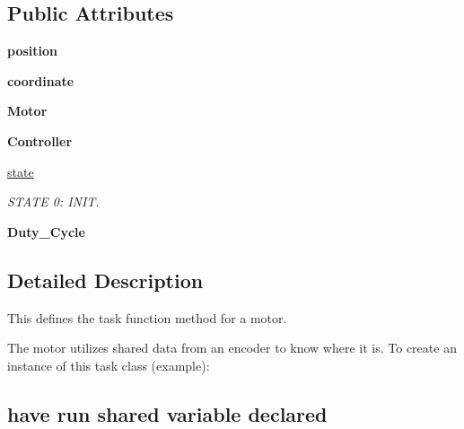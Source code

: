 \subsection*{Public Attributes}
\begin{DoxyCompactItemize}
\item 
{\bfseries position}\hypertarget{classmotor__task__func_1_1Motor__Task_acceb80bb53adab2e82316b4f0b1106d6}{}\label{classmotor__task__func_1_1Motor__Task_acceb80bb53adab2e82316b4f0b1106d6}

\item 
{\bfseries coordinate}\hypertarget{classmotor__task__func_1_1Motor__Task_aa3c4b7c549cf5ce2ea041b097075c2b3}{}\label{classmotor__task__func_1_1Motor__Task_aa3c4b7c549cf5ce2ea041b097075c2b3}

\item 
{\bfseries Motor}\hypertarget{classmotor__task__func_1_1Motor__Task_a625735c62f6b22e02d1d5a31606ed3cf}{}\label{classmotor__task__func_1_1Motor__Task_a625735c62f6b22e02d1d5a31606ed3cf}

\item 
{\bfseries Controller}\hypertarget{classmotor__task__func_1_1Motor__Task_a23a4ecb2af35593aa381c4f97956cb95}{}\label{classmotor__task__func_1_1Motor__Task_a23a4ecb2af35593aa381c4f97956cb95}

\item 
\hyperlink{classmotor__task__func_1_1Motor__Task_a663cf01c6093dee5df31db371be9210f}{state}
\begin{DoxyCompactList}\small\item\em S\+T\+A\+TE 0\+: I\+N\+IT. \end{DoxyCompactList}\item 
{\bfseries Duty\+\_\+\+Cycle}\hypertarget{classmotor__task__func_1_1Motor__Task_a42763856446f503f32d55c1de26edda7}{}\label{classmotor__task__func_1_1Motor__Task_a42763856446f503f32d55c1de26edda7}

\end{DoxyCompactItemize}


\subsection{Detailed Description}
This defines the task function method for a motor. 

The motor utilizes shared data from an encoder to know where it is. To create an instance of this task class (example)\+: \subsection*{have run shared variable declared}

